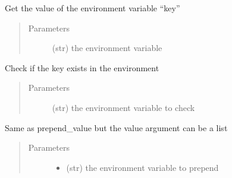 \documentclass[a4paper,10pt,english]{sphinxmanual}
\begin{document}
\begin{fulllineitems}
\begin{fulllineitems}
\label{\detokenize{apidoc_src/src:src.fileEnviron.LauncherFileEnviron.get}}
Get the value of the environment variable “key”
\begin{quote}\begin{description}
\item[{Parameters}] \leavevmode
{} \textendash{} (str) the environment variable

\end{description}\end{quote}

\end{fulllineitems}


\begin{fulllineitems}
\label{\detokenize{apidoc_src/src:src.fileEnviron.LauncherFileEnviron.is_defined}}
Check if the key exists in the environment
\begin{quote}\begin{description}
\item[{Parameters}] \leavevmode
{} \textendash{} (str) the environment variable to check

\end{description}\end{quote}

\end{fulllineitems}


\begin{fulllineitems}
\label{\detokenize{apidoc_src/src:src.fileEnviron.LauncherFileEnviron.prepend}}
Same as prepend\_value but the value argument can be a list
\begin{quote}\begin{description}
\item[{Parameters}] \leavevmode\begin{itemize}
\item {} 
 \textendash{} (str) the environment variable to prepend


\end{itemize}
\end{description}
\end{quote}
\end{fulllineitems}
\end{fulllineitems}
\end{document}
